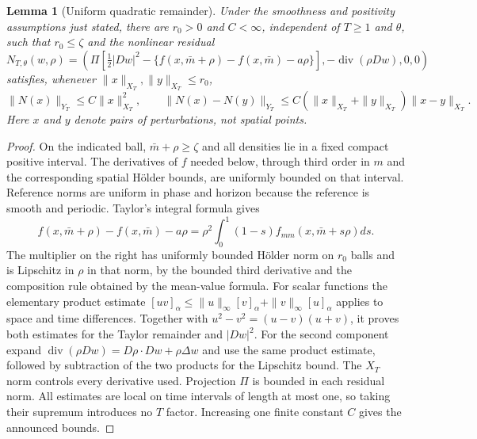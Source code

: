 \documentclass[11pt]{article}
\newtheorem{lemma}[theorem]{Lemma}
\DeclareMathOperator{\diver}{div}
\begin{document}
\begin{lemma}[Uniform quadratic remainder]\label{remainder}
Under the smoothness and positivity assumptions just stated, there are
$r_0>0$ and $C<\infty$, independent of $T\geq1$ and $\theta$, such
that $r_0\leq\zeta$ and the nonlinear residual
\[
 N_{T,\theta}(w,\rho)=
 \left(\Pi\left[\tfrac12|Dw|^2-
   \{f(x,\bar m+\rho)-f(x,\bar m)-a\rho\}\right],
       -\diver(\rho Dw),0,0\right)
\]
satisfies, whenever $\|x\|_{X_T},\|y\|_{X_T}\leq r_0$,
\[
 \|N(x)\|_{Y_T}\leq C\|x\|_{X_T}^2,
 \qquad
 \|N(x)-N(y)\|_{Y_T}
 \leq C(\|x\|_{X_T}+\|y\|_{X_T})\|x-y\|_{X_T}.
\]
Here $x$ and $y$ denote pairs of perturbations, not spatial points.
\end{lemma}
\begin{proof}
On the indicated ball, $\bar m+\rho\geq\zeta$ and all densities lie
in a fixed compact positive interval. The derivatives of $f$ needed
below, through third order in $m$ and the corresponding spatial H\"older
bounds, are uniformly bounded on that interval. Reference norms are
uniform in phase and horizon because the reference is smooth and periodic.
Taylor's integral formula gives
\[
 f(x,\bar m+\rho)-f(x,\bar m)-a\rho
 =\rho^2\int_0^1(1-s)f_{mm}(x,\bar m+s\rho)ds.
\]
The multiplier on the right has uniformly bounded H\"older norm on
$r_0$ balls and is Lipschitz in $\rho$ in that norm, by the bounded
third derivative and the composition rule obtained by the mean-value
formula. For scalar functions the elementary product estimate
$[uv]_\alpha\leq\|u\|_\infty[v]_\alpha+
\|v\|_\infty[u]_\alpha$ applies to space and time differences.
Together with $u^2-v^2=(u-v)(u+v)$, it proves both estimates for the
Taylor remainder and $|Dw|^2$.
For the second component expand
$\diver(\rho Dw)=D\rho\cdot Dw+\rho\Delta w$ and use the same
product estimate, followed by subtraction of the two products for the
Lipschitz bound. The $X_T$ norm controls every derivative used.
Projection $\Pi$ is bounded in each residual norm. All estimates are
local on time intervals of length at most one, so taking their supremum
introduces no $T$ factor. Increasing one finite constant $C$ gives the
announced bounds.
\end{proof}
\end{document}
